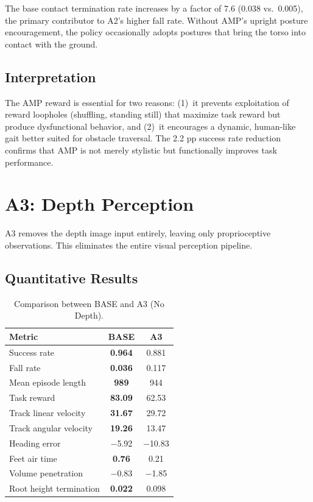 The base contact termination rate increases by a factor of 7.6 (0.038 vs.\ 0.005), the primary contributor to A2's higher fall rate. Without AMP's upright posture encouragement, the policy occasionally adopts postures that bring the torso into contact with the ground.

\subsection{Interpretation}

The AMP reward is essential for two reasons: (1)~it prevents exploitation of reward loopholes (shuffling, standing still) that maximize task reward but produce dysfunctional behavior, and (2)~it encourages a dynamic, human-like gait better suited for obstacle traversal. The 2.2 pp success rate reduction confirms that AMP is not merely stylistic but functionally improves task performance.

\section{A3: Depth Perception}
\label{sec:ablation_depth}

A3 removes the depth image input entirely, leaving only proprioceptive observations. This eliminates the entire visual perception pipeline.

\subsection{Quantitative Results}

\begin{table}[t]
\centering
\caption{Comparison between BASE and A3 (No Depth).}
\label{tab:a3_results}
\begin{tabular}{lcc}
\toprule
\textbf{Metric} & \textbf{BASE} & \textbf{A3} \\
\midrule
Success rate & \textbf{0.964} & 0.881 \\
Fall rate & \textbf{0.036} & 0.117 \\
Mean episode length & \textbf{989} & 944 \\
Task reward & \textbf{83.09} & 62.53 \\
Track linear velocity & \textbf{31.67} & 29.72 \\
Track angular velocity & \textbf{19.26} & 13.47 \\
Heading error & $-$5.92 & $-$10.83 \\
Feet air time & \textbf{0.76} & 0.21 \\
Volume penetration & $-$0.83 & $-$1.85 \\
Root height termination & \textbf{0.022} & 0.098 \\
\bottomrule
\end{tabular}
\end{table}

